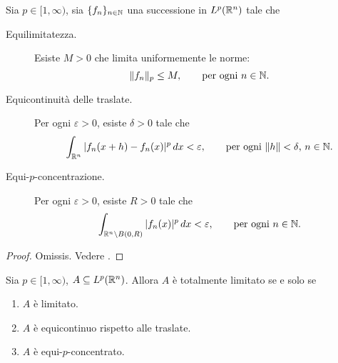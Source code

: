 \begin{theorem}
	Sia $p \in [1,\infty)$, sia $\{f_n\}_{n \in \mathbb{N}}$ una successione in $L^p(\mathbb{R}^n)$ tale che
	\begin{description}
		\item[Equilimitatezza.] Esiste $M>0$ che limita uniformemente le norme:
		\begin{equation*}
			\|f_n\|_{p} \leq M, \qquad \text{per ogni $n \in \mathbb{N}$}.
		\end{equation*}
		\item[Equicontinuità delle traslate.] Per ogni $\varepsilon > 0$, esiste $\delta > 0$ tale che
		\begin{equation*}
			\int_{\mathbb{R}^n} |f_n(x+h) - f_n(x)|^p \,dx < \varepsilon, \qquad \text{per ogni $\|h\| < \delta$, $n \in \mathbb{N}$}.
		\end{equation*}
		\item[Equi-$p$-concentrazione.] Per ogni $\varepsilon > 0$, esiste $R > 0$ tale che
		\begin{equation*}
			\int_{\mathbb{R}^n \setminus B(0,R)} |f_n(x)|^p\,dx < \varepsilon, \qquad \text{per ogni $n \in \mathbb{N}$}.
		\end{equation*}
	\end{description}
\end{theorem}
\begin{proof}
	Omissis. Vedere \cite{brezis2010functional}.
\end{proof}

\begin{corollary}
	Sia $p \in [1,\infty)$, $A \subseteq L^p(\mathbb{R}^n)$.
	Allora $A$ è totalmente limitato se e solo se
	\begin{enumerate}
		\item $A$ è limitato.
		\item $A$ è equicontinuo rispetto alle traslate.
		\item $A$ è equi-$p$-concentrato.
	\end{enumerate}
\end{corollary}
